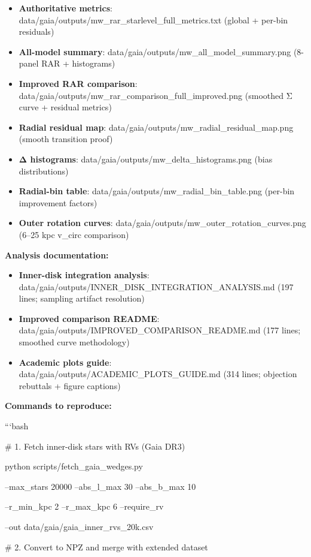 \documentclass[11pt,a4paper]{article}
\begin{document}
\begin{itemize}
\item \textbf{Authoritative metrics}: data/gaia/outputs/mw\_rar\_starlevel\_full\_metrics.txt (global + per-bin residuals)
\item \textbf{All-model summary}: data/gaia/outputs/mw\_all\_model\_summary.png (8-panel RAR + histograms)
\item \textbf{Improved RAR comparison}: data/gaia/outputs/mw\_rar\_comparison\_full\_improved.png (smoothed Σ curve + residual metrics)
\item \textbf{Radial residual map}: data/gaia/outputs/mw\_radial\_residual\_map.png (smooth transition proof)
\item \textbf{Δ histograms}: data/gaia/outputs/mw\_delta\_histograms.png (bias distributions)
\item \textbf{Radial-bin table}: data/gaia/outputs/mw\_radial\_bin\_table.png (per-bin improvement factors)
\item \textbf{Outer rotation curves}: data/gaia/outputs/mw\_outer\_rotation\_curves.png (6–25 kpc v\_circ comparison)
\end{itemize}


\textbf{Analysis documentation:}

\begin{itemize}
\item \textbf{Inner-disk integration analysis}: data/gaia/outputs/INNER\_DISK\_INTEGRATION\_ANALYSIS.md (197 lines; sampling artifact resolution)
\item \textbf{Improved comparison README}: data/gaia/outputs/IMPROVED\_COMPARISON\_README.md (177 lines; smoothed curve methodology)
\item \textbf{Academic plots guide}: data/gaia/outputs/ACADEMIC\_PLOTS\_GUIDE.md (314 lines; objection rebuttals + figure captions)
\end{itemize}


\textbf{Commands to reproduce:}

```bash

\# 1. Fetch inner-disk stars with RVs (Gaia DR3)

python scripts/fetch\_gaia\_wedges.py \

  --max\_stars 20000 --abs\_l\_max 30 --abs\_b\_max 10 \

  --r\_min\_kpc 2 --r\_max\_kpc 6 --require\_rv \

  --out data/gaia/gaia\_inner\_rvs\_20k.csv


\# 2. Convert to NPZ and merge with extended dataset
\end{document}
